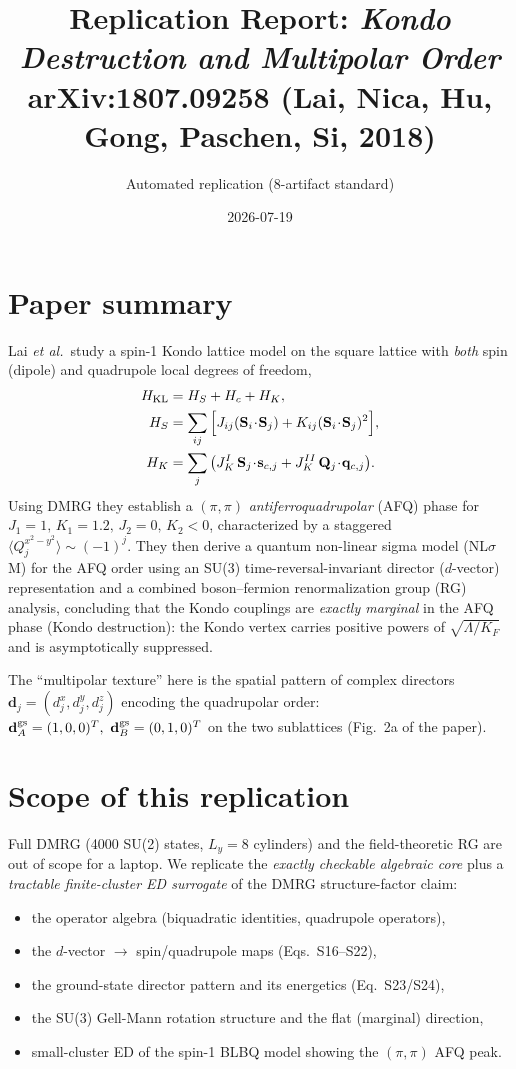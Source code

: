 \documentclass[11pt]{article}
\title{Replication Report: \textit{Kondo Destruction and Multipolar Order}\\
\large arXiv:1807.09258 (Lai, Nica, Hu, Gong, Paschen, Si, 2018)}
\author{Automated replication (8-artifact standard)}
\date{2026-07-19}
\begin{document}
\maketitle

\section{Paper summary}
Lai \emph{et al.}\ study a spin-1 Kondo lattice model on the square lattice with
\emph{both} spin (dipole) and quadrupole local degrees of freedom,
\begin{align}
H_{\rm KL} &= H_S + H_c + H_K,\\
H_S &= \sum_{ij}\Big[ J_{ij}(\mathbf S_i\!\cdot\!\mathbf S_j)
          + K_{ij}(\mathbf S_i\!\cdot\!\mathbf S_j)^2\Big],\\
H_K &= \sum_j\big(J_K^{I}\,\mathbf S_j\!\cdot\!\mathbf s_{c,j}
          + J_K^{II}\,\mathbf Q_j\!\cdot\!\mathbf q_{c,j}\big).
\end{align}
Using DMRG they establish a $(\pi,\pi)$ \emph{antiferroquadrupolar} (AFQ) phase for
$J_1=1,\,K_1=1.2,\,J_2=0,\,K_2<0$, characterized by a staggered
$\langle Q_j^{x^2-y^2}\rangle\sim(-1)^j$. They then derive a quantum non-linear
sigma model (NL$\sigma$M) for the AFQ order using an SU(3) time-reversal-invariant
director ($d$-vector) representation and a combined boson--fermion renormalization
group (RG) analysis, concluding that the Kondo couplings are \emph{exactly marginal}
in the AFQ phase (Kondo destruction): the Kondo vertex carries positive powers of
$\sqrt{\Lambda/K_F}$ and is asymptotically suppressed.

The ``multipolar texture'' here is the spatial pattern of complex directors
$\mathbf d_j=(d_j^x,d_j^y,d_j^z)$ encoding the quadrupolar order:
$\mathbf d^{\rm gs}_A=(1,0,0)^T,\ \mathbf d^{\rm gs}_B=(0,1,0)^T$ on the two
sublattices (Fig.~2a of the paper).

\section{Scope of this replication}
Full DMRG (4000 SU(2) states, $L_y=8$ cylinders) and the field-theoretic RG are out
of scope for a laptop. We replicate the \emph{exactly checkable algebraic core} plus a
\emph{tractable finite-cluster ED surrogate} of the DMRG structure-factor claim:
\begin{itemize}
\item the operator algebra (biquadratic identities, quadrupole operators),
\item the $d$-vector $\to$ spin/quadrupole maps (Eqs.~S16--S22),
\item the ground-state director pattern and its energetics (Eq.~S23/S24),
\item the SU(3) Gell-Mann rotation structure and the flat (marginal) direction,
\item small-cluster ED of the spin-1 BLBQ model showing the $(\pi,\pi)$ AFQ peak.
\end{itemize}
\end{document}
